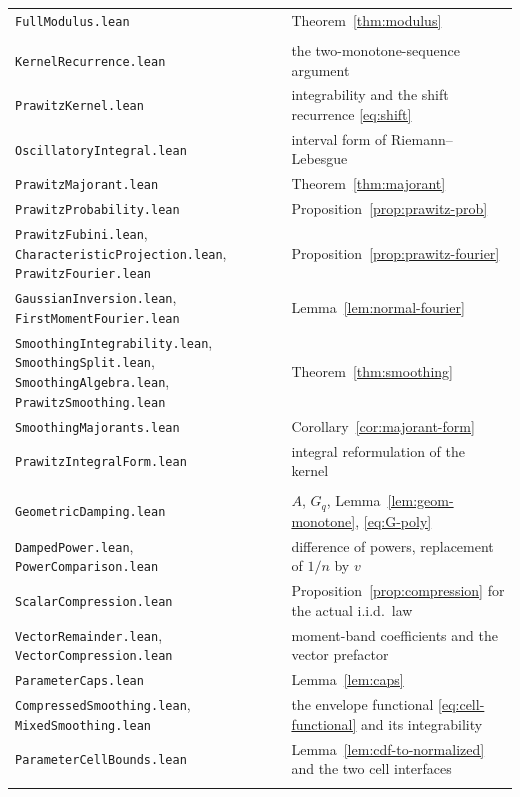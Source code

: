 \documentclass[10pt,a4paper]{article}
\theoremstyle{plain}
\theoremstyle{definition}
\newcommand{\file}[1]{\texttt{#1}}
\begin{document}
{\begin{longtable}{@{}p{5.6cm}p{9.2cm}@{}}
\file{FullModulus.lean} & Theorem~\ref{thm:modulus} \\
\addlinespace
\multicolumn{2}{@{}l}{\emph{Prawitz smoothing}}\\
\file{KernelRecurrence.lean} & the two-monotone-sequence argument \\
\file{PrawitzKernel.lean} & integrability and the shift recurrence \eqref{eq:shift} \\
\file{OscillatoryIntegral.lean} & interval form of Riemann--Lebesgue \\
\file{PrawitzMajorant.lean} & Theorem~\ref{thm:majorant} \\
\file{PrawitzProbability.lean} & Proposition~\ref{prop:prawitz-prob} \\
\file{PrawitzFubini.lean}, \file{CharacteristicProjection.lean}, \file{PrawitzFourier.lean} & Proposition~\ref{prop:prawitz-fourier} \\
\file{GaussianInversion.lean}, \file{FirstMomentFourier.lean} & Lemma~\ref{lem:normal-fourier} \\
\file{SmoothingIntegrability.lean}, \file{SmoothingSplit.lean}, \file{SmoothingAlgebra.lean}, \file{PrawitzSmoothing.lean} & Theorem~\ref{thm:smoothing} \\
\file{SmoothingMajorants.lean} & Corollary~\ref{cor:majorant-form} \\
\file{PrawitzIntegralForm.lean} & integral reformulation of the kernel \\
\addlinespace
\multicolumn{2}{@{}l}{\emph{Compression}}\\
\file{GeometricDamping.lean} & $A$, $G_q$, Lemma~\ref{lem:geom-monotone}, \eqref{eq:G-poly} \\
\file{DampedPower.lean}, \file{PowerComparison.lean} & difference of powers, replacement of $1/n$ by $v$ \\
\file{ScalarCompression.lean} & Proposition~\ref{prop:compression} for the actual i.i.d.\ law \\
\file{VectorRemainder.lean}, \file{VectorCompression.lean} & moment-band coefficients and the vector prefactor \\
\file{ParameterCaps.lean} & Lemma~\ref{lem:caps} \\
\file{CompressedSmoothing.lean}, \file{MixedSmoothing.lean} & the envelope functional \eqref{eq:cell-functional} and its integrability \\
\file{ParameterCellBounds.lean} & Lemma~\ref{lem:cdf-to-normalized} and the two cell interfaces \\
\addlinespace
\multicolumn{2}{@{}l}{\emph{Region I and II}}\\

\end{longtable}}
\end{document}
